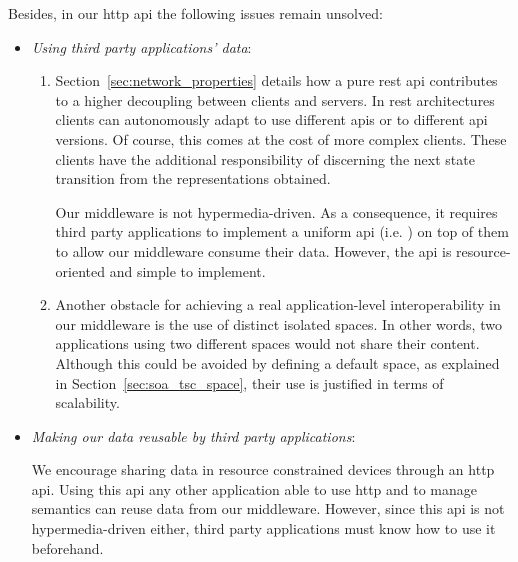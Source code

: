Besides, in our \ac{http} \ac{api} the following issues remain unsolved:
\begin{itemize} %
  \item \emph{Using third party applications' data}:
  \begin{enumerate}
    \item Section~\ref{sec:network_properties} details how a pure \ac{rest} \ac{api} contributes to a higher decoupling between clients and servers.
	  In \ac{rest} architectures clients can autonomously adapt to use different \acp{api} or to different \ac{api} versions. %
	  Of course, this comes at the cost of more complex clients.
	  These clients have the additional responsibility of discerning the next state transition from the representations obtained. %
	  
	  Our middleware is not hypermedia-driven.
	  As a consequence, it requires third party applications to implement a uniform \ac{api} (i.e. \osapi{}) on top of them to allow our middleware consume their data.
	  However, the \ac{api} is resource-oriented and simple to implement.
	  
    \item Another obstacle for achieving a real application-level interoperability in our middleware is the use of distinct isolated spaces.
	  In other words, two applications using two different spaces would not share their content.
	  Although this could be avoided by defining a default space, as explained in Section~\ref{sec:soa_tsc_space}, their use is justified in terms of scalability.
  \end{enumerate}
  
  \item \emph{Making our data reusable by third party applications}:
	
	We encourage sharing data in resource constrained devices through an \ac{http} \ac{api}.
	Using this \ac{api} any other application able to use \ac{http} and to manage semantics can reuse data from our middleware.
	However, since this \ac{api} is not hypermedia-driven either, 
	third party applications must know how to use it beforehand. %
\end{itemize}



